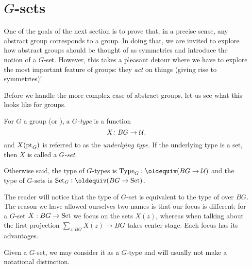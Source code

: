 \section{$G$-sets}
\label{sec:gsets}

One of the goals of the next section is to prove that, in a precise sense, any abstract group corresponds to a group.  In doing that, we are invited to explore how abstract groups should be thought of as symmetries and introduce the notion of a $G$-set.  However, this takes a pleasant detour where we have to explore the most important feature of groups: they \emph{act} on things (giving rise to symmetries)!

Before we handle the more complex case of abstract groups, let us see what this looks like for groups.

\begin{definition}
  For $G$ a group (or \inftygp), a \emph{$G$-type} is a function
  $$X\colon BG\to\mathcal{U},$$
and $X({\mathord{\mathrm{pt}}}_G)$ is referred to as the \emph{underlying type}.
If the underlying type is a set, then $X$ is called a \emph{$G$-set}.

Otherwise said, the type of $G$-types is $\Type_G\defequi(BG\to\UU)$ and the type of $G$-sets is $\Set_G\defequi(BG\to\Set)$.
\end{definition}

\begin{remark}
  The reader will notice that the type of $G$-set is equivalent to the type of \coverings over $BG$.%
The reason we have allowed ourselves two names is that our focus is different: for a $G$-set $X:BG\to\mathord{\mathrm{Set}}$ we focus on the sets $X(z)$, whereas when talking about \coverings the first projection $\sum_{z:BG}X(z)\to BG$ takes center stage.  Each focus has its advantages.

Given a $G$-set, we may consider it as a $G$-type and will usually not make a notational distinction.
\end{remark}


